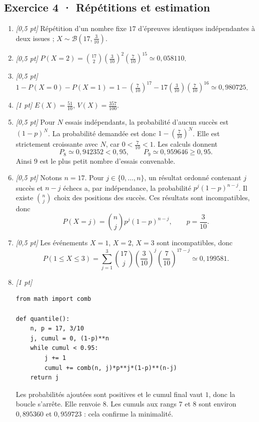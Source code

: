 \subsection*{Exercice 4 · Répétitions et estimation}\begin{enumerate}

\item \textit{[0{,}5 pt]} Répétition d'un nombre fixe $17$ d'épreuves identiques indépendantes à deux issues ; $X\sim\mathcal B(17,\frac{3}{10})$.

\item \textit{[0{,}5 pt]} $P(X=2)=\binom{17}2(\frac{3}{10})^2(\frac{7}{10})^{15}\simeq0{,}058110$.

\item \textit{[0{,}5 pt]} $1-P(X=0)-P(X=1)=1-(\frac{7}{10})^{17}-17(\frac{3}{10})(\frac{7}{10})^{16}\simeq0{,}980725$.

\item \textit{[1 pt]} $E(X)=\frac{51}{10}$, $V(X)=\frac{357}{100}$.

\item \textit{[0{,}5 pt]} Pour $N$ essais indépendants, la probabilité d'aucun succès est $(1-p)^N$. La probabilité demandée est donc $1-(\frac{7}{10})^N$. Elle est strictement croissante avec $N$, car $0<\frac{7}{10}<1$. Les calculs donnent
\[P_{8}\simeq0{,}942352<0{,}95,\qquad P_{9}\simeq0{,}959646\ge0{,}95.\]
Ainsi $9$ est le plus petit nombre d'essais convenable.

\item \textit{[0{,}5 pt]} Notons $n=17$. Pour $j\in\{0,\ldots,n\}$, un résultat ordonné contenant $j$ succès et $n-j$ échecs a, par indépendance, la probabilité $p^j(1-p)^{n-j}$. Il existe $\binom nj$ choix des positions des succès. Ces résultats sont incompatibles, donc
\[P(X=j)=\binom nj p^j(1-p)^{n-j},\qquad p=\frac{3}{10}.\]

\item \textit{[0{,}5 pt]} Les événements $X=1$, $X=2$, $X=3$ sont incompatibles, donc
\[P(1\le X\le3)=\sum_{j=1}^3\binom{17}j(\frac{3}{10})^j(\frac{7}{10})^{17-j}\simeq0{,}199581.\]


\item \textit{[1 pt]} 
\begin{lstlisting}
from math import comb

def quantile():
    n, p = 17, 3/10
    j, cumul = 0, (1-p)**n
    while cumul < 0.95:
        j += 1
        cumul += comb(n, j)*p**j*(1-p)**(n-j)
    return j
\end{lstlisting}
Les probabilités ajoutées sont positives et le cumul final vaut $1$, donc la boucle s'arrête. Elle renvoie $8$. Les cumuls aux rangs $7$ et $8$ sont environ $0{,}895360$ et $0{,}959723$ : cela confirme la minimalité.

\end{enumerate}

